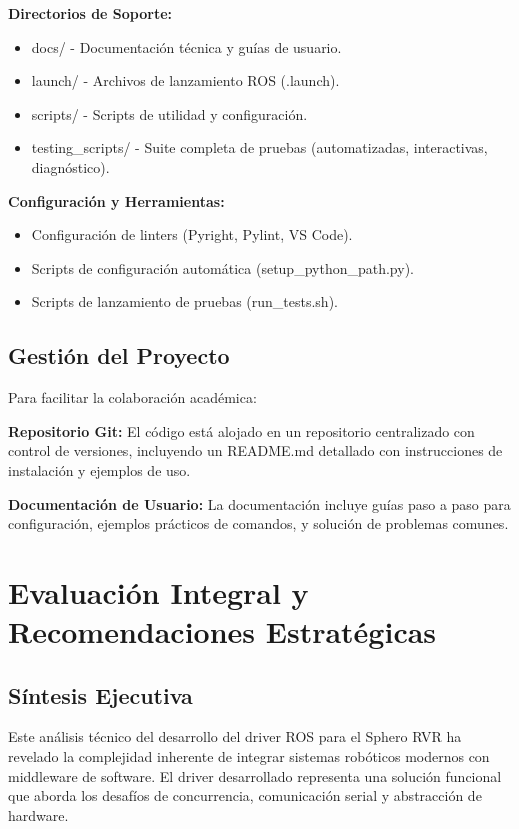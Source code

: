 \documentclass[11pt]{article}
\newcommand{\code}[1]{\textcolor{codeblue}{\url{#1}}}
\numberwithin{figure}{section}
\numberwithin{table}{section}
\def\code#1{#1}%
\begin{document}
\textbf{Directorios de Soporte:}
\begin{itemize}
    \item \code{docs/} - Documentación técnica y guías de usuario.
    \item \code{launch/} - Archivos de lanzamiento ROS (.launch).
    \item \code{scripts/} - Scripts de utilidad y configuración.
    \item \code{testing\_scripts/} - Suite completa de pruebas (automatizadas, interactivas, diagnóstico).
\end{itemize}

\textbf{Configuración y Herramientas:}
\begin{itemize}
    \item Configuración de linters (Pyright, Pylint, VS Code).
    \item Scripts de configuración automática (\code{setup\_python\_path.py}).
    \item Scripts de lanzamiento de pruebas (\code{run\_tests.sh}).
\end{itemize}


\subsection{Gestión del Proyecto}

Para facilitar la colaboración académica:

\textbf{Repositorio Git:} El código está alojado en un repositorio centralizado con control de versiones, incluyendo un README.md detallado con instrucciones de instalación y ejemplos de uso.

\textbf{Documentación de Usuario:} La documentación incluye guías paso a paso para configuración, ejemplos prácticos de comandos, y solución de problemas comunes.


\newpage


\section{Evaluación Integral y Recomendaciones Estratégicas}


\subsection{Síntesis Ejecutiva}

Este análisis técnico del desarrollo del driver ROS para el Sphero RVR ha revelado la complejidad inherente de integrar sistemas robóticos modernos con middleware de software. El driver desarrollado representa una solución funcional que aborda los desafíos de concurrencia, comunicación serial y abstracción de hardware.
\end{document}
